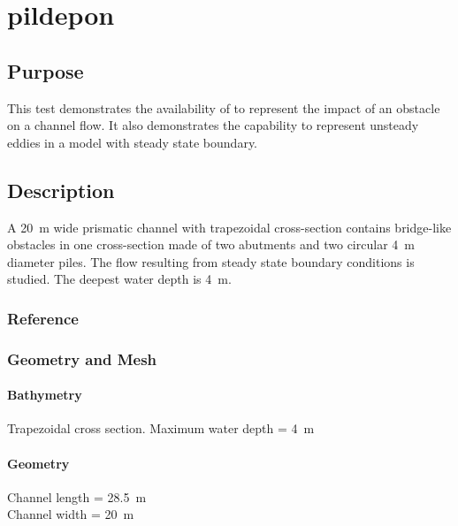 \chapter{pildepon}
%
%
\section{Purpose}
%
This test demonstrates the availability of  to represent
the impact of an obstacle on a channel flow.
It also demonstrates the capability to represent unsteady eddies in a
model with steady state boundary.
%
\section{Description}
%
A 20~m wide prismatic channel with trapezoidal cross-section contains
bridge-like obstacles in one cross-section made of two abutments and two
circular 4~m diameter piles.
The flow resulting from steady state boundary conditions is studied.
The deepest water depth is 4~m.
%
%
%
%
\subsection{Reference}
%

%
%
%
\subsection{Geometry and Mesh}
%
\subsubsection{Bathymetry}
%
Trapezoidal cross section. Maximum water depth = 4~m
%
\subsubsection{Geometry}
%
Channel length = 28.5~m\\
Channel width = 20~m
%
